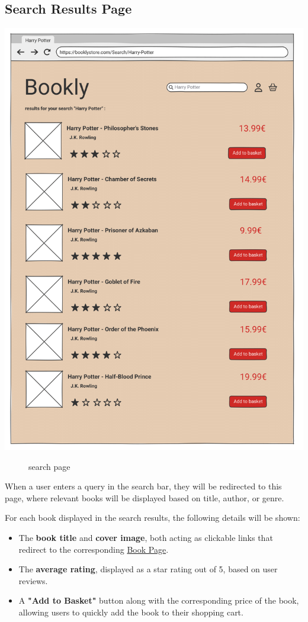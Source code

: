 \subsection{Search Results Page} \label{sec:search}

\includegraphics[width=0.6\linewidth]{HW1Report/photos/searchpage.png}

\begin{figure}[h!]
    \centering
    \caption{search page}
    \label{fig:enter-label}
\end{figure}

When a user enters a query in the search bar, they will be redirected to this page, where relevant books will be displayed based on title, author, or genre.

For each book displayed in the search results, the following details will be shown:
\begin{itemize}
    \item The \textbf{book title} and \textbf{cover image}, both acting as clickable links that redirect to the corresponding \hyperref[sec:book]{Book Page}.
    \item The \textbf{average rating}, displayed as a star rating out of 5, based on user reviews.
    \item A \textbf{"Add to Basket"} button along with the corresponding price of the book, allowing users to quickly add the book to their shopping cart.
\end{itemize}

